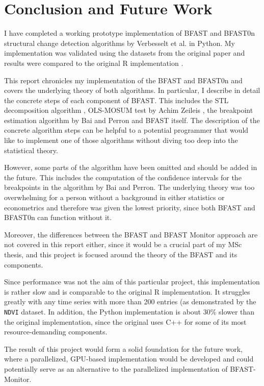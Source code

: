 \documentclass[main.tex]{subfiles}
\begin{document}
\chapter{Conclusion and Future Work}
\label{chap:conclusion_and_future_work}
I have completed a working prototype implementation of BFAST and BFAST0n
structural change detection algorithms by Verbesselt et al. \cite{bfast} in
Python. My implementation was validated using the datasets from the original
paper and results were compared to the original R implementation \cite{bfast-github}.

This report chronicles my implementation of the BFAST and BFAST0n and covers the
underlying theory of both algorithms. In particular, I describe in detail the
concrete steps of each component of BFAST. This includes the STL decomposition
algorithm \cite{stl}, OLS-MOSUM test by Achim Zeileis \cite{strucchange}, the
breakpoint estimation algorithm by Bai and Perron \cite{bai_perron} and BFAST
itself. The description of the concrete algorithm steps can be helpful to a
potential programmer that would like to implement one of those algorithms
without diving too deep into the statistical theory. 

However, some parts of the algorithm have been omitted and should be added in
the future. This includes the computation of the confidence intervals for the
breakpoints in the algorithm by Bai and Perron. The underlying theory was too
overwhelming for a person without a background in either statistics or
econometrics and therefore was given the lowest priority, since both BFAST and
BFAST0n can function without it.

Moreover, the differences between the BFAST and BFAST Monitor \cite{bfast_monitor}
approach are not covered in this report either, since it would be a crucial part of my
MSc thesis, and this project is focused around the theory of the BFAST and its components.

Since performance was not the aim of this particular project, this
implementation is rather slow and is comparable to the original R
implementation. It struggles greatly with any time series with more than 200
entries (as demonstrated by the \texttt{NDVI} dataset. In addition, the Python
implementation is about 30\% slower than the original implementation, since
the original uses C++ for some of its most resource-demanding components.

The result of this project would form a solid foundation for
the future work, where a parallelized, GPU-based implementation would be developed and
could potentially serve as an alternative to the parallelized implementation of
BFAST-Monitor. 


\biblio
\end{document}
